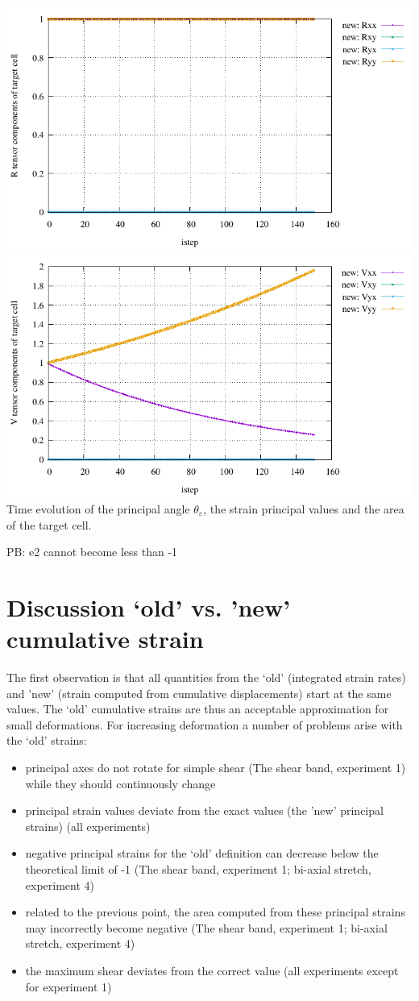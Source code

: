 \begin{center}
\includegraphics[width=9.cm]{python_codes/fieldstone_89/results/biaxial/R.pdf}
\includegraphics[width=9.cm]{python_codes/fieldstone_89/results/biaxial/V.pdf}\\
{\captionfont Time evolution of the principal angle $\theta_\varepsilon$, 
the strain principal values and the area of the target cell.}
\end{center}

PB: e2 cannot become less than -1 


\section{Discussion ‘old’ vs. ’new’ cumulative strain}

The first observation is that all quantities from the ‘old’ (integrated strain rates) and ’new’ (strain computed from cumulative displacements) start at the same values. The ‘old’ cumulative strains are thus an acceptable approximation for small deformations. For increasing deformation a number of problems arise with the ‘old’ strains:

\begin{itemize}
\item principal axes do not rotate for simple shear (The shear band, experiment 1) while they should continuously change
\item principal strain values deviate from the exact values (the ’new’ principal strains) (all experiments)
\item negative principal strains for the ‘old’ definition can decrease below the theoretical limit of -1 (The shear band, experiment 1; bi-axial stretch, experiment 4)
\item related to the previous point, the area computed from these principal strains may incorrectly become negative (The shear band, experiment 1;  bi-axial stretch, experiment 4)
\item the maximum shear deviates from the correct value (all experiments except for experiment 1)
\end{itemize}

